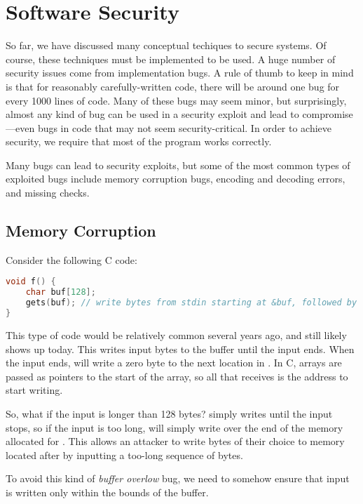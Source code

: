 \chapter{Software Security}

So far, we have discussed many conceptual techiques to secure systems. Of course, these techniques must be implemented to be used. A huge number of security issues come from implementation bugs. A rule of thumb to keep in mind is that for reasonably carefully-written code, there will be around one bug for every 1000 lines of code. Many of these bugs may seem minor, but surprisingly, almost any kind of bug can be used in a security exploit and lead to compromise---even bugs in code that may not seem security-critical. In order to achieve security, we require that most of the program works correctly.

Many bugs can lead to security exploits, but some of the most common types of exploited bugs include memory corruption bugs, encoding and decoding errors, and missing checks.

\section{Memory Corruption}
Consider the following C code:

\begin{lstlisting}[language=c]
void f() {
	char buf[128];
	gets(buf); // write bytes from stdin starting at &buf, followed by a '0'
}
\end{lstlisting}

This type of code would be relatively common several years ago, and still likely shows up today. This writes input bytes to the buffer until the input ends. When the input ends,  will write a zero byte to the next location in . In C, arrays are passed as pointers to the start of the array, so all that  receives is the address to start writing.

So, what if the input is longer than 128 bytes?  simply writes until the input stops, so if the input is too long,  will simply write over the end of the memory allocated for . This allows an attacker to write bytes of their choice to memory located after  by inputting a too-long sequence of bytes.


To avoid this kind of \emph{buffer overlow} bug, we need to somehow ensure that input is written only within the bounds of the buffer. 

